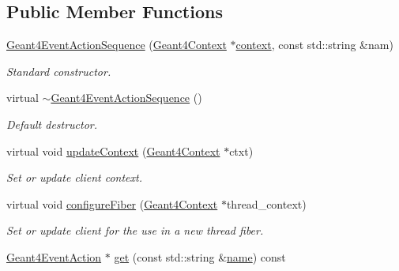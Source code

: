 \subsection*{Public Member Functions}
\begin{DoxyCompactItemize}
\item 
\hyperlink{class_d_d4hep_1_1_simulation_1_1_geant4_event_action_sequence_aae9103fd1f5de6027adf6f9d652423f9}{Geant4\+Event\+Action\+Sequence} (\hyperlink{class_d_d4hep_1_1_simulation_1_1_geant4_context}{Geant4\+Context} $\ast$\hyperlink{class_d_d4hep_1_1_simulation_1_1_geant4_action_aa9d87f0ec2a72b7fc2591b18f98d75cf}{context}, const std\+::string \&nam)
\begin{DoxyCompactList}\small\item\em Standard constructor. \end{DoxyCompactList}\item 
virtual \hyperlink{class_d_d4hep_1_1_simulation_1_1_geant4_event_action_sequence_af5bbb63ed3aceb9249cbba78c47fd241}{$\sim$\+Geant4\+Event\+Action\+Sequence} ()
\begin{DoxyCompactList}\small\item\em Default destructor. \end{DoxyCompactList}\item 
virtual void \hyperlink{class_d_d4hep_1_1_simulation_1_1_geant4_event_action_sequence_a26291513e94aec2a01464d0121532999}{update\+Context} (\hyperlink{class_d_d4hep_1_1_simulation_1_1_geant4_context}{Geant4\+Context} $\ast$ctxt)
\begin{DoxyCompactList}\small\item\em Set or update client context. \end{DoxyCompactList}\item 
virtual void \hyperlink{class_d_d4hep_1_1_simulation_1_1_geant4_event_action_sequence_a552fac0ec8632b417f81453b4d79e0c4}{configure\+Fiber} (\hyperlink{class_d_d4hep_1_1_simulation_1_1_geant4_context}{Geant4\+Context} $\ast$thread\+\_\+context)
\begin{DoxyCompactList}\small\item\em Set or update client for the use in a new thread fiber. \end{DoxyCompactList}\item 
\hyperlink{class_d_d4hep_1_1_simulation_1_1_geant4_event_action}{Geant4\+Event\+Action} $\ast$ \hyperlink{class_d_d4hep_1_1_simulation_1_1_geant4_event_action_sequence_a6ea64e0a8834b3ce73b66191d8055c81}{get} (const std\+::string \&\hyperlink{class_d_d4hep_1_1_simulation_1_1_geant4_action_af374e70b014d16afb81dd9d77cc3894b}{name}) const

\end{DoxyCompactItemize}
